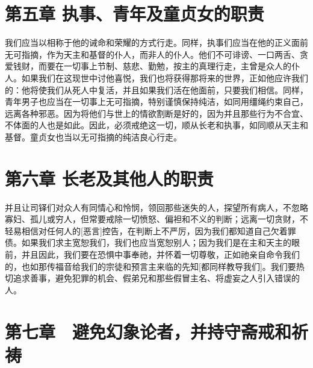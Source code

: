 
\section{第五章 执事、青年及童贞女的职责}

我们应当以相称于他的诫命和荣耀的方式行走。同样，执事们应当在他的正义面前无可指摘，作为天主和基督的仆人，而非人的仆人。他们不可诽谤、一口两舌、贪爱钱财，而要在一切事上节制、慈悲、勤勉，按主的真理行走，主曾是众人的仆人。如果我们在这现世中讨他喜悦，我们也将获得那将来的世界，正如他应许我们的：他将使我们从死人中复活，并且如果我们活在他面前，只要我们相信。同样，青年男子也应当在一切事上无可指摘，特别谨慎保持纯洁，如同用缰绳约束自己，远离各种邪恶。因为将他们与世上的情欲割断是好的，因为并且那些行为不合宜、不体面的人也是如此。因此，必须戒绝这一切，顺从长老和执事，如同顺从天主和基督。童贞女也当以无可指摘的纯洁良心行走。\par


\section{第六章 长老及其他人的职责}

并且让司铎们对众人有同情心和怜悯，领回那些迷失的人，探望所有病人，不忽略寡妇、孤儿或穷人，但常要戒除一切愤怒、偏袒和不义的判断；远离一切贪财，不轻易相信对任何人的[恶言]控告，在判断上不严厉，因为我们都知道自己欠着罪债。如果我们求主宽恕我们，我们也应当宽恕别人；因为我们是在主和天主的眼前，并且因此，我们要在恐惧中事奉祂，并怀着一切尊敬，正如祂亲自命令我们的，也如那传福音给我们的宗徒和预言主来临的先知[都同样教导我们]。我们要热切追求善事，避免犯罪的机会、假弟兄和那些假冒主名、将虚妄之人引入错误的人。\par


\section{第七章　避免幻象论者，并持守斋戒和祈祷}

